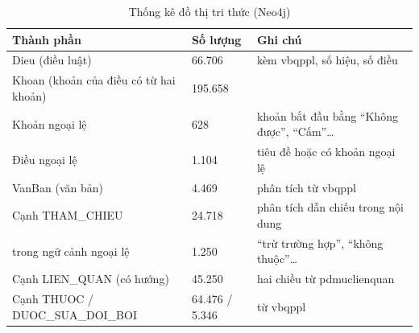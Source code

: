 \begin{table}[H]
\centering
\small
\caption{Thống kê đồ thị tri thức (Neo4j)}
\label{tab:dothi}
\begin{tabular}{|L{5.6cm}|L{2.0cm}|L{6.0cm}|}
\hline
\textbf{Thành phần} & \textbf{Số lượng} & \textbf{Ghi chú} \\ \hline
Dieu (điều luật) & 66.706 & kèm vbqppl, số hiệu, số điều \\ \hline
Khoan (khoản của điều có từ hai khoản) & 195.658 &  \\ \hline
Khoản ngoại lệ & 628 & khoản bắt đầu bằng ``Không được'', ``Cấm''\ldots \\ \hline
Điều ngoại lệ & 1.104 & tiêu đề hoặc có khoản ngoại lệ \\ \hline
VanBan (văn bản) & 4.469 & phân tích từ vbqppl \\ \hline
Cạnh THAM\_CHIEU & 24.718 & phân tích dẫn chiếu trong nội dung \\ \hline
\quad trong ngữ cảnh ngoại lệ & 1.250 & ``trừ trường hợp'', ``không thuộc''\ldots \\ \hline
Cạnh LIEN\_QUAN (có hướng) & 45.250 & hai chiều từ pdmuclienquan \\ \hline
Cạnh THUOC / DUOC\_SUA\_DOI\_BOI & 64.476 / 5.346 & từ vbqppl \\ \hline
\end{tabular}
\end{table}
